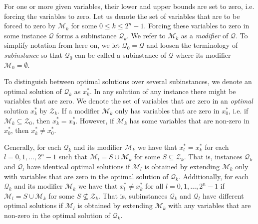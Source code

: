 For one or more given variables, their lower and upper bounds are set to zero,
i.e. forcing the variables to zero.
Let us denote the set of variables that are to be forced to zero by
$\mathcal{M}_k$ for some $0 \leq k \leq 2^n - 1$.
Forcing these variables to zero in some instance $\mathcal{Q}$ forms
a subinstance $\mathcal{Q}_k$. We refer to $\mathcal{M}_k$ as a
\emph{modifier} of $\mathcal{Q}$.
To simplify notation from here on, we let
$\mathcal{Q}_0 = \mathcal{Q}$ and loosen the terminology of
\emph{subinstance} so that $\mathcal{Q}_0$ can be called a subinstance of
$\mathcal{Q}$ where its modifier $\mathcal{M}_0 = \emptyset$.

To distinguish between optimal solutions over several subinstances, we denote
an optimal solution of $\mathcal{Q}_k$ as $x_k^*$.
In any solution of any instance there might be variables that are zero.
We denote the set of variables that are zero in an \emph{optimal} solution
$x_k^*$ by $\mathcal{Z}_k$.
If a modifier $\mathcal{M}_k$ only has variables that are zero in $x_0^*$,
i.e. if $\mathcal{M}_k \subseteq \mathcal{Z}_0$, then $x_k^* = x_0^*$. However,
if $\mathcal{M}_k$ has some variables that are non-zero in $x_0^*$, then
$x_k^* \neq x_0^*$.

Generally, for each $\mathcal{Q}_k$ and its modifier $\mathcal{M}_k$ we
have that $x_l^* = x_k^*$ for each $l=0,1,\ldots,2^n - 1$ such that
$\mathcal{M}_l = S \cup \mathcal{M}_k$ for some $S \subseteq \mathcal{Z}_k$.
That is, instances $\mathcal{Q}_k$ and $\mathcal{Q}_l$ have identical optimal
solutions if $\mathcal{M}_l$ is obtained by extending $\mathcal{M}_k$ only with
variables that are zero in the optimal solution of $\mathcal{Q}_k$.
Additionally, for each $\mathcal{Q}_k$ and its modifier $\mathcal{M}_k$ we
have that $x_l^* \neq x_k^*$ for all $l=0,1,\ldots,2^n - 1$ if
$\mathcal{M}_l = S \cup \mathcal{M}_k$ for some $S\not\subseteq \mathcal{Z}_k$.
That is, subinstances $\mathcal{Q}_k$ and $\mathcal{Q}_l$ have different
optimal solutions if $\mathcal{M}_l$ is obtained by extending $\mathcal{M}_k$
with any variables that are non-zero in the optimal solution of
$\mathcal{Q}_k$.
